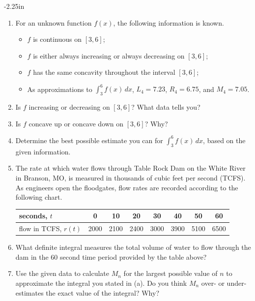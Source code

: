 \begin{adjustwidth*}{}{-2.25in}
\setlength{\columnsep}{25pt}
\begin{multicols*}{2}\small

\begin{enumerate}[1),start=27]
  \item For an unknown function $f(x)$, the following information is known.  
  \begin{itemize}
  	\item $f$ is continuous on $[3,6]$;
	\item $f$ is either always increasing or always decreasing on $[3,6]$;
	\item $f$ has the same concavity throughout the interval $[3,6]$;
	\item As approximations to $\int_3^6 f(x) \, dx$, $L_4 = 7.23$, $R_4 = 6.75$, and $M_4 = 7.05$.
  \end{itemize}
  \ba
  	\item Is $f$ increasing or decreasing on $[3,6]$?  What data tells you?
	\item Is $f$ concave up or concave down on $[3,6]$?  Why?
	\item Determine the best possible estimate you can for $\int_3^6 f(x) \, dx$, based on the given information.
  \ea
  
    \item The rate at which water flows through Table Rock Dam on the White River in Branson, MO, is measured in thousands of cubic feet per second (TCFS).  As engineers open the floodgates, flow rates are recorded according to the following chart.
  \begin{center}
\begin{tabular}{|l|c|c|c|c|c|c|c|}
\hline
seconds, $t$ & 0 & 10 & 20 & 30 & 40 & 50 & 60 \\
\hline
flow in TCFS, $r(t)$ & 2000 & 2100 & 2400 & 3000 & 3900 & 5100 & 6500 \\
\hline
\end{tabular}
\end{center}
	\ba
		\item What definite integral measures the total volume of water to flow through the dam in the 60 second time period provided by the table above?
		\item Use the given data to calculate $M_n$ for the largest possible value of $n$ to approximate the integral you stated in (a).  Do you think $M_n$ over- or under-estimates the exact value of the integral?  Why?
		

\end{enumerate}
\end{multicols*}
\end{adjustwidth*}
